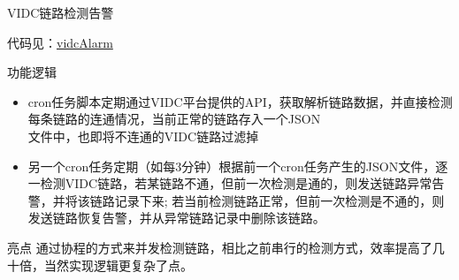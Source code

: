 \documentclass[CJK]{beamer}
\begin{document}
\begin{CJK*}{UTF8}{gbsn}
\begin{frame}{VIDC链路检测告警}

代码见：\href{http://10.24.178.60:8000/yongfengxia/scripts/tree/master/vidcAlarm}{vidcAlarm}

\begin{block}{功能逻辑}
\begin{itemize}
\item cron任务脚本定期通过VIDC平台提供的API，获取解析链路数据，并直接检测每条链路的连通情况，当前正常的链路存入一个JSON\\文件中，也即将不连通的VIDC链路过滤掉
\item 另一个cron任务定期（如每3分钟）根据前一个cron任务产生的JSON文件，逐一检测VIDC链路，若某链路不通，但前一次检测是通的，则发送链路异常告警，并将该链路记录下来; 若当前检测链路正常，但前一次检测是不通的，则发送链路恢复告警，并从异常链路记录中删除该链路。
\end{itemize}
\end{block}
\begin{block}{亮点}
通过协程的方式来并发检测链路，相比之前串行的检测方式，效率提高了几十倍，当然实现逻辑更复杂了点。
\end{block}
\end{frame}
\end{CJK*}
\end{document}
